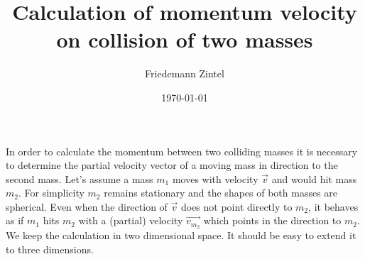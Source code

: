 \documentclass[a4paper]{article}
\title{Calculation of momentum velocity on collision of two masses}
\author{Friedemann Zintel}
\date{\today}
\begin{document}
\maketitle

In order to calculate the momentum between two colliding masses it is necessary to determine the partial velocity vector of a moving mass in direction to the second mass.
Let's assume a mass $m_1$ moves with velocity $\vec{v}$ and would hit mass $m_2$. For simplicity $m_2$ remains stationary and the shapes of both masses are spherical.
Even when the direction of $\vec{v}$ does not point directly to $m_2$, it behaves as if $m_1$ hits $m_2$ with a (partial) velocity $\vec{v_{m_2}}$ which points in the direction to $m_2$. We keep the calculation in two dimensional space.
It should be easy to extend it to three dimensions.
\end{document}
